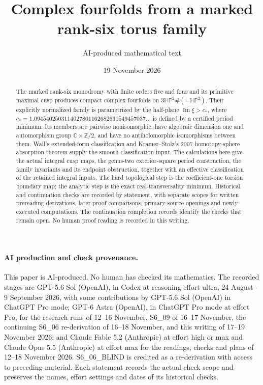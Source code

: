 

\title{Complex fourfolds from a marked rank-six torus family}
\author{AI-produced mathematical text}
\date{19 November 2026}
\maketitle

\begin{abstract}
The marked rank-six monodromy with finite orders five and four and its
primitive maximal cusp produces compact complex fourfolds on
$3\mathbb{HP}^2\#(-\mathbb{HP}^2)$. Their explicitly normalized family
is parametrized by the half-plane $\operatorname{Im}\xi>c_*$, where
$c_*=1.0945402503114027801162682630549457037\ldots$ is defined by
a certified period minimum. Its members are pairwise nonisomorphic,
have algebraic dimension one and automorphism group
$\mathbb C\times\mathbb Z/2$, and have no antiholomorphic
isomorphisms between them. Wall's extended-form classification and
Kramer--Stolz's 2007 homotopy-sphere absorption theorem supply the
smooth classification input. The calculations here give the actual
integral cusp maps, the genus-two exterior-square period construction,
the family invariants and its endpoint obstruction, together with an
effective classification of the retained integral inputs. The hard
topological step is the coefficient-one torsion boundary map; the
analytic step is the exact real-transversality minimum. Historical and continuation
checks are recorded by statement, with separate scopes for written
prereading derivations, later proof comparisons, primary-source
openings and newly executed computations. The continuation completion
records identify the checks that remain open. No human proof reading
is recorded in this writing.
\end{abstract}
\paragraph{AI production and check provenance.}
This paper is AI-produced. No human has checked its mathematics.
The recorded stages are GPT-5.6 Sol (OpenAI), in Codex at reasoning
effort ultra, 24 August--9 September 2026, with some contributions by
GPT-5.6 Sol (OpenAI) in ChatGPT Pro mode; GPT-6 Astra (OpenAI), in
ChatGPT Pro mode at effort Pro, for the research runs of 12--16
November, S6\_09 of 16--17 November, the continuing S6\_06 re-derivation
of 16--18 November, and this writing of 17--19 November 2026;
and Claude Fable 5.2 (Anthropic)
at effort high or max and Claude Opus 5.5 (Anthropic) at effort max
for the readings, checks and plans of 12--18 November 2026.
S6\_06\_BLIND is credited as a re-derivation with access to preceding
material. Each statement records the actual check scope and preserves
the names, effort settings and dates of its historical checks.

